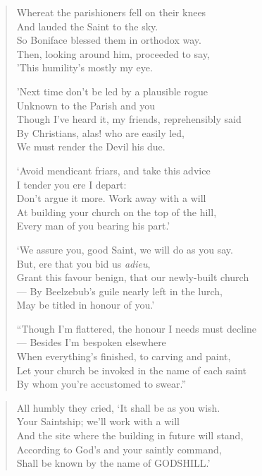 \documentclass[
  12pt,
  a5paper,
  twoside]{book}
\begin{document}
\begin{quote}
Whereat the parishioners fell on their knees\\
And lauded the Saint to the sky.\\
So Boniface blessed them in orthodox way.\\
Then, looking around him, proceeded to say,\\
'This humility's mostly my eye.

'Next time don't be led by a plausible rogue\\
Unknown to the Parish and you\\
Though I've heard it, my friends, reprehensibly said\\
By Christians, alas! who are easily led,\\
We must render the Devil his due.

`Avoid mendicant friars, and take this advice\\
I tender you ere I depart:\\
Don't argue it more. Work away with a will\\
At building your church on the top of the hill,\\
Every man of you bearing his part.'

`We assure you, good Saint, we will do as you say.\\
But, ere that you bid us \emph{adieu},\\
Grant this favour benign, that our newly-built church\\
--- By Beelzebub's guile nearly left in the lurch,\\
May be titled in honour of you.'

``Though I'm flattered, the honour I needs must decline\\
--- Besides I'm bespoken elsewhere\\
When everything's finished, to carving and paint,\\
Let your church be invoked in the name of each saint\\
By whom you're accustomed to swear.''
\end{quote}

\begin{quote}
All humbly they cried, `It shall be as you wish.\\
Your Saintship; we'll work with a will\\
And the site where the building in future will stand,\\
According to God's and your saintly command,\\
Shall be known by the name of GODSHILL.'
\end{quote}
\end{document}
